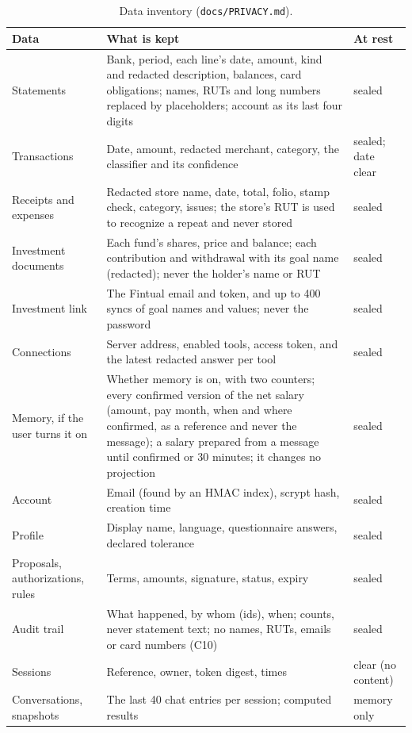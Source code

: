 \begin{table}[htbp]
  \centering
  \small
  \begin{tabularx}{\linewidth}{@{}p{30mm}Xp{24mm}@{}}
    \toprule
    Data & What is kept & At rest \\
    \midrule
    Statements & Bank, period, each line's date, amount, kind and redacted description, balances, card obligations; names, RUTs and long numbers replaced by placeholders; account as its last four digits & sealed \\
    Transactions & Date, amount, redacted merchant, category, the classifier and its confidence & sealed; date clear \\
    Receipts and expenses & Redacted store name, date, total, folio, stamp check, category, issues; the store's RUT is used to recognize a repeat and never stored & sealed \\
    Investment documents & Each fund's shares, price and balance; each contribution and withdrawal with its goal name (redacted); never the holder's name or RUT & sealed \\
    Investment link & The Fintual email and token, and up to 400 syncs of goal names and values; never the password & sealed \\
    Connections & Server address, enabled tools, access token, and the latest redacted answer per tool & sealed \\
    Memory, if the user turns it on & Whether memory is on, with two counters; every confirmed version of the net salary (amount, pay month, when and where confirmed, as a reference and never the message); a salary prepared from a message until confirmed or 30 minutes; it changes no projection & sealed \\
    Account & Email (found by an HMAC index), scrypt hash, creation time & sealed \\
    Profile & Display name, language, questionnaire answers, declared tolerance & sealed \\
    Proposals, authorizations, rules & Terms, amounts, signature, status, expiry & sealed \\
    Audit trail & What happened, by whom (ids), when; counts, never statement text; no names, RUTs, emails or card numbers (C10) & sealed \\
    Sessions & Reference, owner, token digest, times & clear (no content) \\
    Conversations, snapshots & The last 40 chat entries per session; computed results & memory only \\
    \bottomrule
  \end{tabularx}
  \caption{Data inventory (\texttt{docs/PRIVACY.md}).}\label{tab:inventory}
\end{table}

